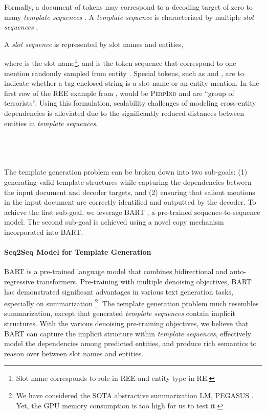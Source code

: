 \documentclass[11pt]{article}
\begin{document}
Formally, a document of tokens  may correspond to a decoding target of zero to many \textit{template sequences} . A \textit{template sequence}  is characterized by multiple \textit{slot sequences} , 

{
\vspace{-4mm}

}A \textit{slot sequence}  is represented by slot names and entities,

{
\vspace{-4mm}

}where  is the slot name\footnote{Slot name corresponds to role in REE and entity type in RE. }, and  is the token sequence that correspond to one mention randomly sampled from entity . Special tokens, such as  and , are to indicate whether a tag-enclosed string is a slot name or an entity mention. In the first row of the REE example from ,  would be \textsc{PerpInd} and  are ``group of terrorists''. Using this formulation, scalability challenges of modeling cross-entity dependencies is alleviated due to the significantly reduced distances between entities in \textit{template sequences}. 

\subsection{\modellong~}
\label{sec:model_detail}
The template generation problem can be broken down into two sub-goals: (1) generating valid template structures while capturing the dependencies between the input document and decoder targets, and (2) ensuring that salient mentions in the input document are correctly identified and outputted by the decoder. To achieve the first sub-goal, we leverage BART \cite{lewis-etal-2020-bart}, a pre-trained sequence-to-sequence model. The second sub-goal is achieved using a novel copy mechanism incorporated into BART.

\paragraph{Seq2Seq Model for Template Generation}
BART \cite{lewis-etal-2020-bart} is a pre-trained language model that combines bidirectional and auto-regressive transformers. Pre-training with multiple denoising objectives, BART has demonstrated significant advantages in various text generation tasks, especially on summarization \cite{lewis-etal-2020-bart}\footnote{We have considered the SOTA abstractive summarization LM, PEGASUS \cite{zhang2019pegasus}. Yet, the GPU memory consumption is too high for us to test it.}. The template generation problem much resembles summarization, except that generated \textit{template sequences} contain implicit structures. With the various denoising pre-training objectives, we believe that \textsc{BART} can capture the implicit structure within \textit{template sequences}, effectively model the dependencies among predicted entities, and produce rich semantics to reason over between slot names and entities. 
\end{document}
